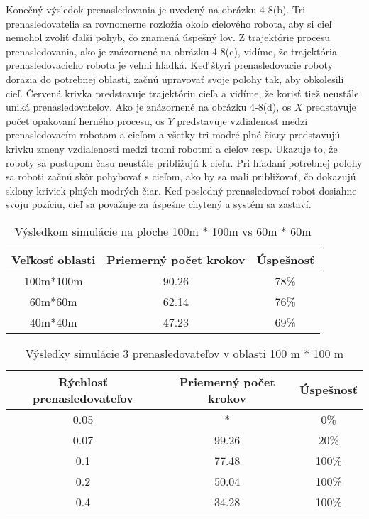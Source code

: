 \justifying 
\noindent 
Konečný výsledok prenasledovania je uvedený na obrázku 4-8(b). Tri prenasledovatelia sa rovnomerne rozložia okolo cieľového robota, aby si cieľ nemohol zvoliť ďalší pohyb, čo znamená úspešný lov. Z trajektórie procesu prenasledovania, ako je znázornené na obrázku 4-8(c), vidíme, že trajektória prenasledovacieho robota je veľmi hladká. Keď štyri prenasledovacie roboty dorazia do potrebnej oblasti, začnú upravovať svoje polohy tak, aby obkolesili cieľ. Červená krivka predstavuje trajektóriu cieľa a vidíme, že korisť tiež neustále uniká prenasledovateľov. Ako je znázornené na obrázku 4-8(d), os $X$ predstavuje počet opakovaní herného procesu, os $Y$ predstavuje vzdialenosť medzi prenasledovacím robotom a cieľom a všetky tri modré plné čiary predstavujú krivku zmeny vzdialenosti medzi tromi robotmi a cieľov resp. Ukazuje to, že roboty sa postupom času neustále približujú k cieľu. Pri hľadaní potrebnej polohy sa roboti začnú skôr pohybovať s cieľom, ako by sa mali približovať, čo dokazujú sklony kriviek plných modrých čiar. Keď posledný prenasledovací robot dosiahne svoju pozíciu, cieľ sa považuje za úspešne chytený a systém sa zastaví.
\begin{table}[h!]
    \centering
        \begin{tabular}{|c c c|} 
        \hline
        Veľkosť oblasti & Priemerný počet krokov & Úspešnosť \\ [0.5ex] 
        \hline\hline
        100m*100m & 90.26 & 78\% \\ 
        \hline
        60m*60m & 62.14 & 76\% \\
        \hline 
        40m*40m & 47.23 & 69\% \\
        \hline 
       \end{tabular}
       \caption{Výsledkom simulácie na ploche 100m * 100m vs 60m * 60m }
        \label{table:1}
\end{table}
\begin{table}[h!]
    \centering
        \begin{tabular}{|c c c|} 
        \hline
        Rýchlosť prenasledovateľov & Priemerný počet krokov & Úspešnosť \\ [0.5ex] 
        \hline\hline
        0.05 & * & 0\% \\ 
        \hline
        0.07 & 99.26 & 20\% \\
        \hline 
        0.1 & 77.48 & 100\% \\
        \hline 
        0.2 & 50.04 & 100\% \\
        \hline 
        0.4 & 34.28 & 100\% \\
        \hline 
       \end{tabular}
       \caption{Výsledky simulácie 3 prenasledovateľov v oblasti 100 m * 100 m}
        \label{table:1}
\end{table}

